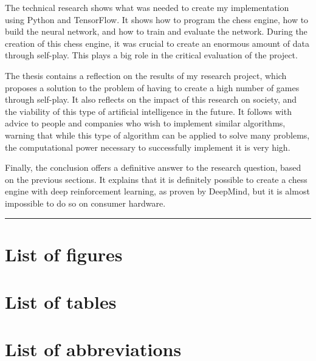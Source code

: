 \documentclass{article}
\makeatletter
\renewcommand\tableofcontents{%
  \null\hfill\textbf{\Huge\contentsname}\hfill\null\par
  \vline\noexpand\rule{\textwidth}{1pt}%
  \@mkboth{\MakeUppercase\contentsname}{\MakeUppercase\contentsname}%
  \@starttoc{toc}%
}
\makeatother
\begin{document}
The technical research shows what was needed to create my implementation using Python and TensorFlow. 
It shows how to program the chess engine, how to build the neural network, and how to train and evaluate the network.
During the creation of this chess engine, it was crucial to create an enormous amount of data through self-play.
This plays a big role in the critical evaluation of the project. 

The thesis contains a reflection on the results of my research project, which proposes a solution to the problem of
having to create a high number of games through self-play. It also reflects on the impact of this research on society, and the
viability of this type of artificial intelligence in the future. 
It follows with advice to people and companies who wish to implement similar algorithms, warning that while this type of 
algorithm can be applied to solve many problems, the computational power necessary to successfully implement it is very high. 

Finally, the conclusion offers a definitive answer to the research question, based on the previous sections.
It explains that it is definitely possible to create a chess engine with deep reinforcement learning, as proven by DeepMind,
but it is almost impossible to do so on consumer hardware. 

\newpage
\thispagestyle{empty}
\mbox{}
\newpage

\tableofcontents
\newpage

\section*{List of figures}
\renewcommand{\listfigurename}{}
\listoffigures

\section*{List of tables}
\renewcommand{\listtablename}{}
\listoftables

\newpage
\section*{List of abbreviations}
\end{document}
